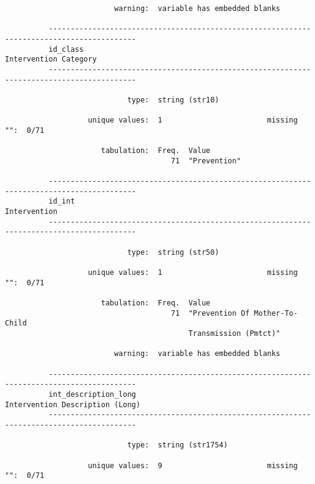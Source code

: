 \documentclass{article}
\begin{document}
\begin{verbatim}
                         warning:  variable has embedded blanks
          
          ------------------------------------------------------------------------------------------
          id_class                                                             Intervention Category
          ------------------------------------------------------------------------------------------
          
                            type:  string (str10)
          
                   unique values:  1                        missing "":  0/71
          
                      tabulation:  Freq.  Value
                                      71  "Prevention"
          
          ------------------------------------------------------------------------------------------
          id_int                                                                        Intervention
          ------------------------------------------------------------------------------------------
          
                            type:  string (str50)
          
                   unique values:  1                        missing "":  0/71
          
                      tabulation:  Freq.  Value
                                      71  "Prevention Of Mother-To-Child
                                          Transmission (Pmtct)"
          
                         warning:  variable has embedded blanks
          
          ------------------------------------------------------------------------------------------
          int_description_long                                       Intervention Description (Long)
          ------------------------------------------------------------------------------------------
          
                            type:  string (str1754)
          
                   unique values:  9                        missing "":  0/71
          

\end{verbatim}
\end{document}

